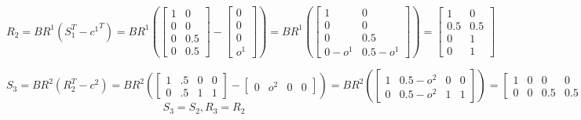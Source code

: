 \documentclass[10]{article}
\begin{document}
\begin{equation*}
R_2=
BR^1(S_1^T-{c^1}^T)=
BR^1(
\begin{bmatrix}
1 & 0\\
0 & 0\\
0 & 0.5\\
0 & 0.5
\end{bmatrix}
-
\begin{bmatrix}
0 \\
0 \\
0 \\
o^1
\end{bmatrix}
)
=
BR^1(
\begin{bmatrix}
1 & 0\\
0 & 0\\
0 & 0.5\\
0-o^1 & 0.5-o^1
\end{bmatrix}
)
=
\begin{bmatrix}
1 & 0\\
0.5 & 0.5\\
0 & 1\\
0 & 1
\end{bmatrix}
\end{equation*}

\begin{equation*}
S_3=
BR^2(R_2^T-c^2)=
BR^2(
\begin{bmatrix}
1 & .5 & 0 & 0\\
0 & .5 & 1 & 1
\end{bmatrix}
-
\begin{bmatrix}
0 & o^2 & 0 & 0
\end{bmatrix}
)
=
BR^2(
\begin{bmatrix}
 1      & 0.5-o^2   & 0  & 0   \\
0     & 0.5-o^2   & 1      & 1 
\end{bmatrix}
)
=
\begin{bmatrix}
1 & 0 & 0 & 0\\
0 & 0 & 0.5 & 0.5
\end{bmatrix}
\end{equation*}
\begin{equation*}
S_3=S_2,
R_3=R_2
\end{equation*}
\end{document}
